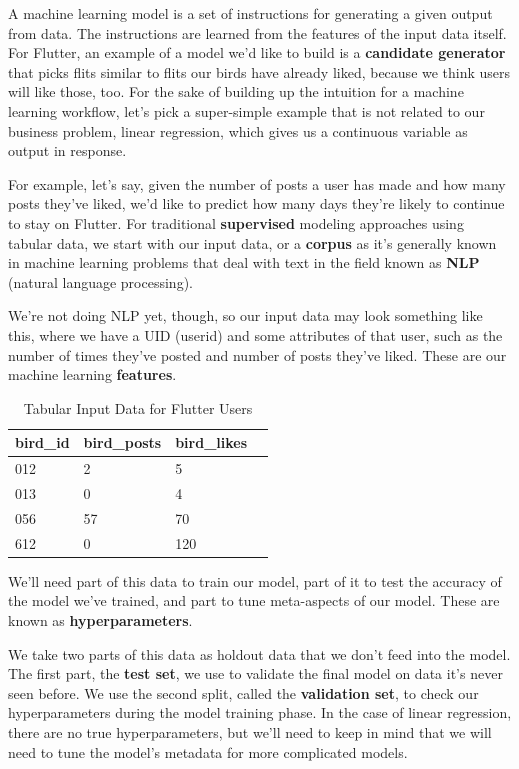 \documentclass[11pt, table]{diazessay} %
\begin{document}
\begin{sloppypar}
A machine learning model is a set of instructions for generating a given output from data. The instructions are learned from the features of the input data itself.   For Flutter, an example of a model we'd like to build is a \textbf{candidate generator} that picks flits similar to flits our birds have already liked, because we think users will like those, too. For the sake of building up the intuition for a machine learning workflow, let's pick a super-simple example that is not related to our business problem, linear regression, which gives us a continuous variable as output in response.

For example, let's say, given the number of posts a user has made and how many posts they've liked, we'd like to predict how many days they're likely to continue to stay on Flutter.  For traditional \textbf{supervised} modeling approaches using tabular data, we start with our input data, or a \textbf{corpus} as it's generally known in machine learning problems that deal with text in the field known as \textbf{NLP} (natural language processing).

We're not doing NLP yet, though, so our input data may look something like this, where we have a UID (userid) and some attributes of that user, such as the number of times they've posted and number of posts they've liked. These are our machine learning \textbf{features}.

\begin{table}[H]
  \centering
    \caption{Tabular Input Data for Flutter Users}
\begin{tabular}{|l|l|l|l|}
\hline
\rowcolor[HTML]{D5E7F7}
bird\_id & bird\_posts & bird\_likes \\ \hline
012 	 & 2  		   	 & 5  		 \\ \hline
013 	 & 0  		   	 & 4  		 \\ \hline
056 	 & 57 		   	 & 70 		 \\ \hline
612 	 & 0  				 & 120		 \\ \hline
\end{tabular}
\end{table}

We'll need part of this data to train our model, part of it to test the accuracy of the model we've trained, and part to tune meta-aspects of our model. These are known as \textbf{hyperparameters}.

We take two parts of this data as holdout data that we don't feed into the model. The first part, the \textbf{test set}, we use to validate the final model on data it's never seen before. We use the second split, called the \textbf{validation set}, to check our hyperparameters  during the model training phase. In the case of linear regression, there are no true hyperparameters, but we'll need to keep  in mind that we will need to tune the model's metadata for more complicated models.


\end{sloppypar}
\end{document}
